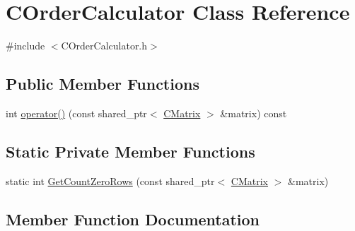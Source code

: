 \hypertarget{classCOrderCalculator}{}\section{C\+Order\+Calculator Class Reference}
\label{classCOrderCalculator}


{\ttfamily \#include $<$C\+Order\+Calculator.\+h$>$}

\subsection*{Public Member Functions}
\begin{DoxyCompactItemize}
\item 
int \hyperlink{classCOrderCalculator_a34946aaf27501915d1bc854df890ac1d}{operator()} (const shared\+\_\+ptr$<$ \hyperlink{classCMatrix}{C\+Matrix} $>$ \&matrix) const 
\end{DoxyCompactItemize}
\subsection*{Static Private Member Functions}
\begin{DoxyCompactItemize}
\item 
static int \hyperlink{classCOrderCalculator_a869754ec328076c2b8c6c0ef43c37dcd}{Get\+Count\+Zero\+Rows} (const shared\+\_\+ptr$<$ \hyperlink{classCMatrix}{C\+Matrix} $>$ \&matrix)
\end{DoxyCompactItemize}


\subsection{Member Function Documentation}
